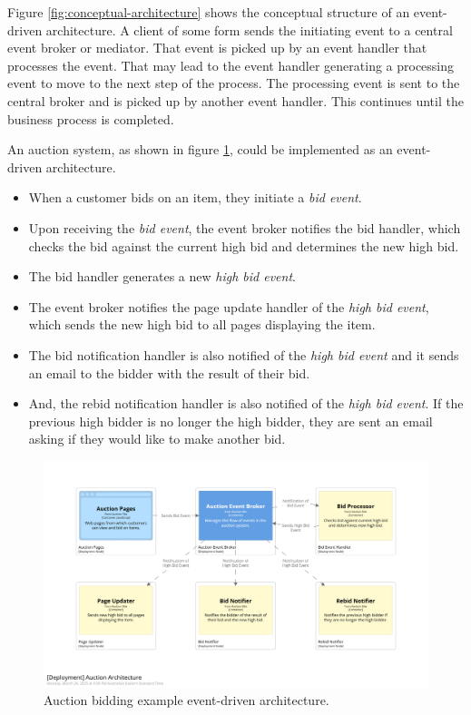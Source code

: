 Figure \ref{fig:conceptual-architecture} shows the conceptual structure of an event-driven architecture.
A client of some form sends the initiating event to a central event broker or mediator.
That event is picked up by an event handler that processes the event.
That may lead to the event handler generating a processing event to move to the next step of the process.
The processing event is sent to the central broker and is picked up by another event handler.
This continues until the business process is completed.

\filbreak
An auction system, as shown in figure \ref{fig:auction-architecture}, could be implemented as an event-driven architecture.
\begin{itemize}[topsep=2pt,partopsep=1pt,itemsep=1pt,parsep=1pt]
    \item When a customer bids on an item, they initiate a \textit{bid event}.
    \item Upon receiving the \textit{bid event}, the event broker notifies the bid handler, which checks the bid against the current high bid and determines the new high bid.
    \item The bid handler generates a new \textit{high bid event}.
    \item The event broker notifies the page update handler of the \textit{high bid event}, which sends the new high bid to all pages displaying the item.
    \item The bid notification handler is also notified of the \textit{high bid event} and it sends an email to the bidder with the result of their bid.
    \item And, the rebid notification handler is also notified of the \textit{high bid event}.
          If the previous high bidder is no longer the high bidder, they are sent an email asking if they would like to make another bid.
\end{itemize}

\begin{figure}[h!]
    \begin{adjustwidth}{-10mm}{-10mm}
        \centering
        \includegraphics[trim=195 230 195 162,clip,width=0.95\paperwidth]{diagrams/auction-architecture.png}
    \end{adjustwidth}
    \caption{Auction bidding example event-driven architecture.}
    \label{fig:auction-architecture}
\end{figure}

